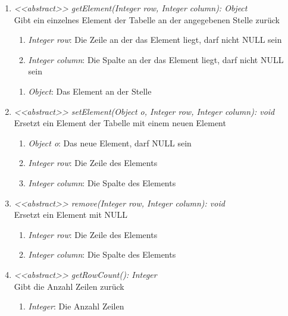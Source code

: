 \begin{enumerate}[+]
	\item \textit{<{<abstract>}> getElement(Integer row, Integer column): Object} \\
	Gibt ein einzelnes Element der Tabelle an der angegebenen Stelle zurück
	\begin{enumerate}[$\bullet$]
		\item \textit{Integer row}: Die Zeile an der das Element liegt, darf nicht NULL sein
		\item \textit{Integer column}: Die Spalte an der das Element liegt, darf nicht NULL sein
	\end{enumerate}
	\vspace{-0.2cm}
	\begin{enumerate}[$\circ$]
		\item \textit{Object}: Das Element an der Stelle
	\end{enumerate}
	
	\item \textit{<{<abstract>}> setElement(Object o, Integer row, Integer column): void} \\
	Ersetzt ein Element der Tabelle mit einem neuen Element
	\begin{enumerate}[$\bullet$]
		\item \textit{Object o}: Das neue Element, darf NULL sein
		\item \textit{Integer row}: Die Zeile des Elements
		\item \textit{Integer column}: Die Spalte des Elements
	\end{enumerate}
	\vspace{-0.2cm}
	
	\item \textit{<{<abstract>}> remove(Integer row, Integer column): void} \\
	Ersetzt ein Element mit NULL
	\begin{enumerate}[$\bullet$]
		\item \textit{Integer row}: Die Zeile des Elements
		\item \textit{Integer column}: Die Spalte des Elements
	\end{enumerate}
	\vspace{-0.2cm}
	
	\item \textit{<{<abstract>}> getRowCount(): Integer} \\
	Gibt die Anzahl Zeilen zurück
	\vspace{-0.2cm}
	\begin{enumerate}[$\circ$]
		\item \textit{Integer}: Die Anzahl Zeilen
	\end{enumerate}


\end{enumerate}
